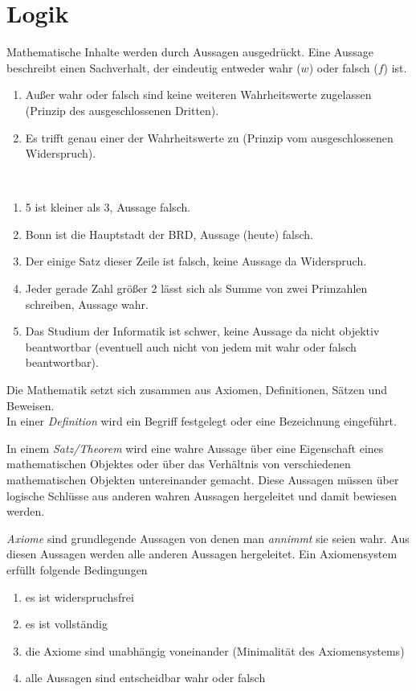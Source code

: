 \chapter{Logik}
Mathematische Inhalte werden durch Aussagen ausgedrückt. Eine Aussage beschreibt einen Sachverhalt, der eindeutig entweder wahr ($w$) oder falsch ($f$) ist.
\begin{enumerate}
\item Außer wahr oder falsch sind keine weiteren Wahrheitswerte zugelassen (Prinzip des ausgeschlossenen Dritten).
\item Es trifft genau einer der Wahrheitswerte zu (Prinzip vom ausgeschlossenen Widerspruch).
\end{enumerate}

\begin{example}~
\begin{enumerate}
\item 5 ist kleiner als 3, Aussage falsch.
\item Bonn ist die Hauptstadt der BRD, Aussage (heute) falsch.
\item Der einige Satz dieser Zeile ist falsch, keine Aussage da Widerspruch.
\item Jeder gerade Zahl größer 2 lässt sich als Summe von zwei Primzahlen schreiben, Aussage wahr.
\item Das Studium der Informatik ist schwer, keine Aussage da nicht objektiv beantwortbar (eventuell auch nicht von jedem mit wahr oder falsch beantwortbar).
\end{enumerate}
\end{example}

Die Mathematik setzt sich zusammen aus Axiomen, Definitionen, Sätzen und Beweisen.\\
In einer \emph{Definition} wird ein Begriff festgelegt oder eine Bezeichnung eingeführt.

In einem \emph{Satz/Theorem} wird eine wahre Aussage über eine Eigenschaft eines mathematischen Objektes oder über das Verhältnis von verschiedenen mathematischen Objekten untereinander gemacht. Diese Aussagen müssen über logische Schlüsse aus anderen wahren Aussagen hergeleitet und damit bewiesen werden.

\emph{Axiome} sind grundlegende Aussagen von denen man \emph{annimmt} sie seien wahr. Aus diesen Aussagen werden alle anderen Aussagen hergeleitet. Ein Axiomensystem erfüllt folgende Bedingungen
\begin{enumerate}
\item es ist widerspruchsfrei
\item es ist vollständig
\item die Axiome sind unabhängig voneinander (Minimalität des Axiomensystems)
\item alle Aussagen sind entscheidbar wahr oder falsch
\end{enumerate}

